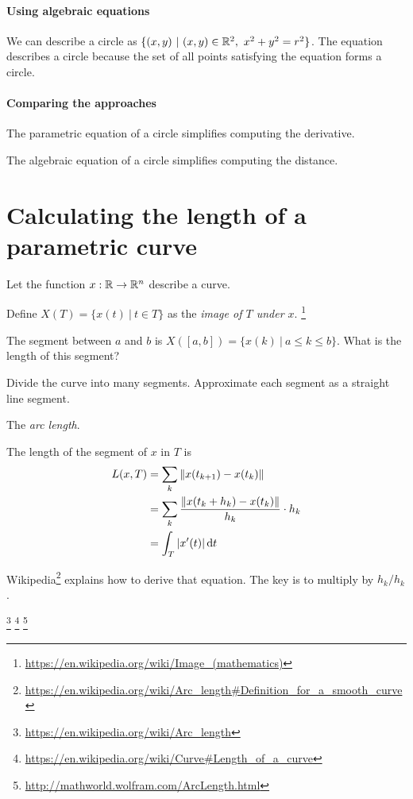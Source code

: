 \paragraph{Using algebraic equations}

We can describe a circle as \( \{ (x,y) ~|~ (x,y) \in \mathbb{R}^2, ~ x^2 + y^2 = r^2 \} \).
The equation describes a circle because the set of all points satisfying the equation forms a circle.

\paragraph{Comparing the approaches}

The parametric equation of a circle simplifies computing the derivative.

The algebraic equation of a circle simplifies computing the distance.

\section*{Calculating the length of a parametric curve}

Let the function \(x : \mathbb{R} \to \mathbb{R}^n\) describe a curve.

Define \(X(T) = \{ x(t) ~|~ t \in T \}\) as the \emph{image of \(T\) under \(x\)}.
\footnote{\url{https://en.wikipedia.org/wiki/Image_(mathematics)}}

The segment between \(a\) and \(b\) is \( X([a,b]) = \{ x(k) ~|~ a \le k \le b \} \).
What is the length of this segment?

Divide the curve into many segments.
Approximate each segment as a straight line segment.

The \emph{arc length}.

The length of the segment of \(x\) in \(T\) is
\begin{align*}
    L(x,T) &= \sum_k \norm{x(t_{k+1}) - x(t_k)}
    \\ &= \sum_k \frac{\norm{x(t_k + h_k) - x(t_k)}}{h_k} \cdot h_k
    \\ &= \int_T \abs{x'(t)} \dd{t}
\end{align*}

Wikipedia\footnote{\url{https://en.wikipedia.org/wiki/Arc_length\#Definition_for_a_smooth_curve}}
explains how to derive that equation.
The key is to multiply by \(h_k / h_k\).

\footnote{\url{https://en.wikipedia.org/wiki/Arc_length}}%
\footnote{\url{https://en.wikipedia.org/wiki/Curve\#Length_of_a_curve}}%
\footnote{\url{http://mathworld.wolfram.com/ArcLength.html}}

